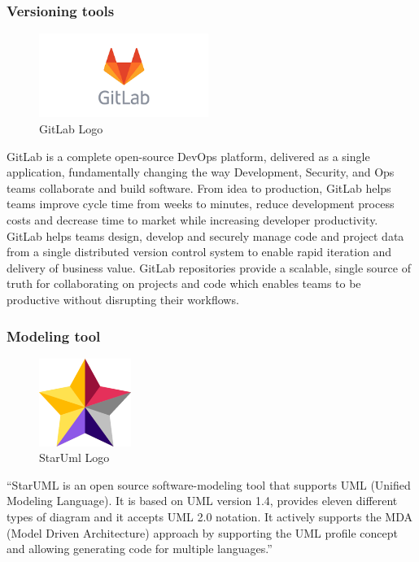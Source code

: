 \documentclass[]{report}
\begin{document}
\subsubsection{Versioning tools}
\begin{figure}
	\includegraphics[width=5.5cm]{gitlab}
	\caption{GitLab Logo}
\end{figure} 

GitLab is a complete open-source DevOps platform, delivered as a single application, fundamentally changing the way Development, Security, and Ops teams collaborate and build software. From idea to production, GitLab helps teams improve cycle time from weeks to minutes, reduce development process costs and decrease time to market while increasing developer productivity.
GitLab helps teams design, develop and securely manage code and project data from a single distributed version control system to enable rapid iteration and delivery of business value. GitLab repositories provide a scalable, single source of truth for collaborating on projects and code which enables teams to be productive without disrupting their workflows.


\subsubsection{Modeling tool}


\begin{figure}
	\includegraphics[width=3cm]{Staruml}
	\caption{StarUml Logo}
\end{figure} 


“StarUML is an open source software-modeling tool that supports UML (Unified Modeling Language). It is based on UML version 1.4, provides eleven different types of diagram and it accepts UML 2.0 notation. It actively supports the MDA (Model Driven Architecture) approach by supporting the UML profile concept and allowing generating code for multiple languages.”  \\\\\\\\\\\par
\end{document}
